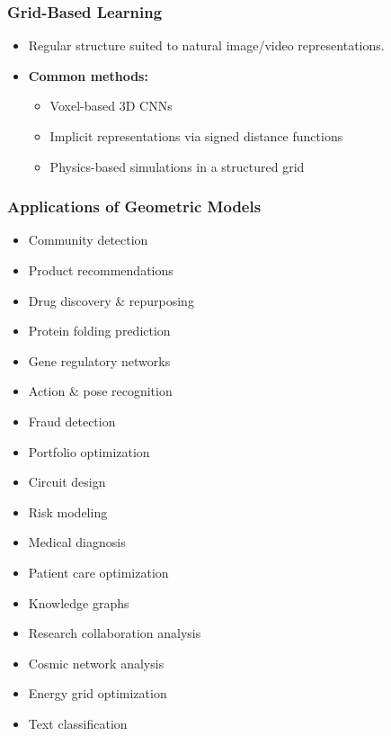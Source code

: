 \begin{frame}[fragile]\frametitle{Grid-Based Learning}
  \begin{itemize}
    \item Regular structure suited to natural image/video representations.
    \item \textbf{Common methods:}
    \begin{itemize}
      \item Voxel-based 3D CNNs
      \item Implicit representations via signed distance functions
      \item Physics-based simulations in a structured grid
    \end{itemize}
  \end{itemize}
\end{frame}

\begin{frame}[fragile]\frametitle{Applications of Geometric Models}
  \small
    \begin{itemize}
      \item Community detection
      \item Product recommendations
      \item Drug discovery \& repurposing
      \item Protein folding prediction
      \item Gene regulatory networks
      \item Action \& pose recognition
      \item Fraud detection
      \item Portfolio optimization
      \item Circuit design
      \item Risk modeling
      \item Medical diagnosis
      \item Patient care optimization
      \item Knowledge graphs
      \item Research collaboration analysis
      \item Cosmic network analysis
      \item Energy grid optimization
      \item Text classification
    \end{itemize}
\end{frame}

